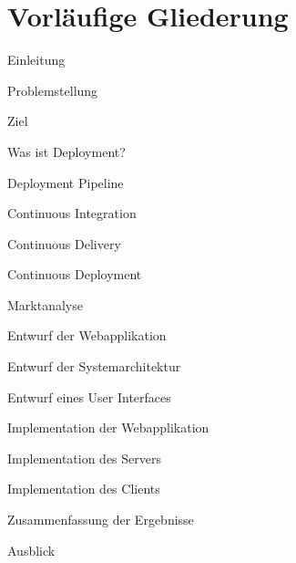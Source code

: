 \documentclass{scrartcl}
\begin{document}
\pagebreak

\section{Vorläufige Gliederung}
\label{sec:gliederung}

\begin{tocpreview}
  \item Einleitung
    \begin{tocpreview}
      \item Problemstellung
      \item Ziel
    \end{tocpreview}
  \item Was ist Deployment?
    \begin{tocpreview}
      \item Deployment Pipeline
      \item Continuous Integration
      \item Continuous Delivery
      \item Continuous Deployment
    \end{tocpreview}
  \item Marktanalyse
  \item Entwurf der Webapplikation
    \begin{tocpreview}
      \item Entwurf der Systemarchitektur
      \item Entwurf eines User Interfaces
    \end{tocpreview}
  \item Implementation der Webapplikation
    \begin{tocpreview}
      \item Implementation des Servers
      \item Implementation des Clients
    \end{tocpreview}
  \item Zusammenfassung der Ergebnisse
  \item Ausblick
\end{tocpreview}

\pagebreak




\end{document}
